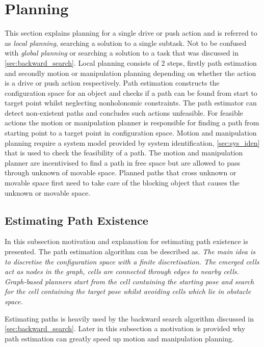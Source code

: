 \section{Planning}%
\label{sec:planning}
This section explains planning for a single drive or push action and is referred to as \textit{local planning}, searching a solution to a single subtask. Not to be confused with \textit{global planning} or searching a solution to a task that was discussed in \cref{sec:backward_search}. Local planning consists of 2 steps, firstly path estimation and secondly motion or manipulation planning depending on whether the action is a drive or push action respectively. Path estimation constructs the configuration space for an object and checks if a path can be found from start to target point whilst neglecting nonholonomic constraints. The path estimator can detect non-existent paths and concludes such actions unfeasible. For feasible actions the motion or manipulation planner is responsible for finding a path from starting point to a target point in configuration space. Motion and manipulation planning require a system model provided by system identification, \cref{sec:sys_iden} that is used to check the feasibility of a path. The motion and manipulation planner are incentivised to find a path in free space but are allowed to pass through unknown of movable space. Planned paths that cross unknown or movable space first need to take care of the blocking object that causes the unknown or movable space.\bs

\subsection{Estimating Path Existence}%
\label{subsec:path_estimation}
In this subsection motivation and explanation for estimating path existence is presented. The path estimation algorithm can be described as. \textit{The main idea is to discretise the configuration space with a finite discretisation. The emerged cells act as nodes in the graph, cells are connected through edges to nearby cells. Graph-based planners start from the cell containing the starting pose and search for the cell containing the target pose whilst avoiding cells which lie in obstacle space.\bs}

Estimating paths is heavily used by the backward search algorithm discussed in \cref{sec:backward_search}. Later in this subsection a motivation is provided why path estimation can greatly speed up motion and manipulation planning.\bs

